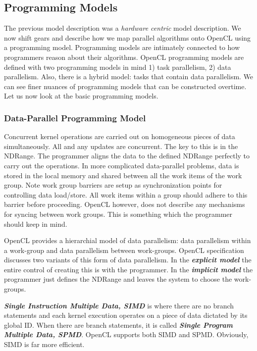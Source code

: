 \subsection{Programming Models}
The previous model description was a \textit{hardware centric} model description. We now shift gears and describe how we map parallel algorithms onto OpenCL using a programming model. Programming models are intimately connected to how programmers reason about their algorithms. OpenCL programming models are defined with two programming models in mind 1) task parallelism, 2) data parallelism. Also, there is a hybrid model: tasks that contain data parallelism. We can see finer nuances of programming models that can be constructed overtime. Let us now look at the basic programming models.

\subsubsection{Data-Parallel Programming Model}
Concurrent kernel operations are carried out on homogeneous pieces of data simultaneously. All and any updates are concurrent. The key to this is in the NDRange. The programmer aligns the data to the defined NDRange perfectly to carry out the operations. In more complicated data-parallel problems, data is stored in the local memory and shared between all the work items of the work group. Note work group barriers are setup as synchronization points for controlling data load/store. All work items within a group should adhere to this barrier before proceeding. OpenCL however, does not describe any mechanisms for syncing between work groups. This is something which the programmer should keep in mind.

OpenCL provides a hierarchial model of data parallelism: data parallelism within a work-group and data parallelism between work-groups. OpenCL specification discusses two variants of this form of data parallelism. In the \textit{\textbf{explicit model}} the entire control of creating this is with the programmer. In the \textit{\textbf{implicit model}} the programmer just defines the NDRange and leaves the system to choose the work-groups.

\textit{\textbf{Single Instruction Multiple Data, SIMD}} is where there are no branch statements and each kernel execution operates on a piece of data dictated by its global ID. When there are branch statements, it is called \textit{\textbf{Single Program Multiple Data, SPMD}}. OpenCL supports both SIMD and SPMD. Obviously, SIMD is far more efficient.

